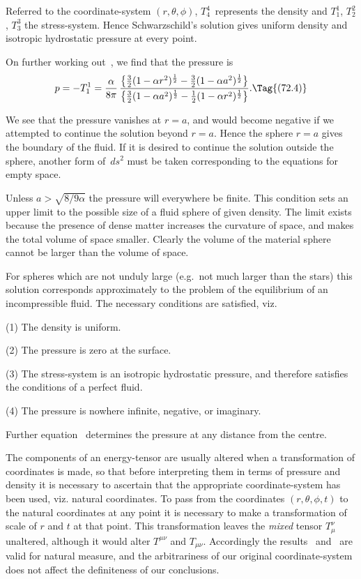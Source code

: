 \documentclass[12pt]{book}
\begin{document}
Referred to the coordinate\hyp{}system $(r, \theta, \phi)$, $T_{4}^{4}$~represents the density and
$T_{1}^{1}$, $T_{2}^{2}$, $T_{3}^{3}$ the stress\hyp{}system. Hence Schwarzschild's solution gives uniform
density and isotropic hydrostatic pressure at every point.
%

On further working out~, we find that the pressure is
\[
p = -T_{1}^{1}
= \frac{\alpha}{8\pi}\,
\frac{\bigl\{\frac{3}{2}(1 - \alpha r^{2})^{\frac{1}{2}} - \frac{3}{2}(1 - \alpha a^2)^{\frac{1}{2}}\bigr\}}
     {\bigl\{\frac{3}{2}(1 - \alpha a^2)^{\frac{1}{2}} - \frac{1}{2}(1 - \alpha r^{2})^{\frac{1}{2}}\bigr\}}.
\Tag{(72.4)}
\]

We see that the pressure vanishes at $r = a$, and would become negative if
we attempted to continue the solution beyond $r = a$. Hence the sphere $r = a$
gives the boundary of the fluid. If it is desired to continue the solution outside
the sphere, another form of~$ds^{2}$ must be taken corresponding to the
equations for empty space.

Unless $a > \sqrt{8/9\alpha}$ the pressure will everywhere be finite. This condition
sets an upper limit to the possible size of a fluid sphere of given density. The
limit exists because the presence of dense matter increases the curvature of
space, and makes the total volume of space smaller. Clearly the volume of the
material sphere cannot be larger than the volume of space.

For spheres which are not unduly large (e.g.\ not much larger than the
stars) this solution corresponds approximately to the problem of the equilibrium
of an incompressible fluid. The necessary conditions are satisfied, viz.\

(1) The density is uniform.

(2) The pressure is zero at the surface.

(3) The stress\hyp{}system is an isotropic hydrostatic pressure, and therefore
satisfies the conditions of a perfect fluid.

(4) The pressure is nowhere infinite, negative, or imaginary.

Further equation~ determines the pressure at any distance from the
centre.

The components of an energy\hyp{}tensor are usually altered when a transformation of coordinates is made, so that before
interpreting them in terms of pressure and density it is necessary to ascertain that the appropriate coordinate\hyp{}system
has been used, viz. natural coordinates.
To pass from the coordinates $(r,\theta,\phi,t)$ to the natural coordinates at any point it is necessary to make a
transformation of scale of $r$ and $t$ at that point.
This transformation leaves the \emph{mixed} tensor $T_{\mu}^{\nu}$ unaltered, although it would alter $T^{\mu\nu}$
and $T_{\mu\nu}$.
Accordingly the results~ and~ are valid for natural measure, and the arbitrariness of our
original coordinate\hyp{}system does not affect the definiteness of our conclusions.
\end{document}
